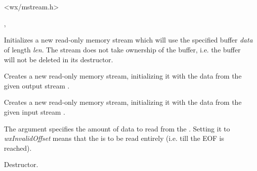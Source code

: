 \section{}\label{wxmeminputstream}




<wx/mstream.h>


, 


\label{wxmemoryinputstreamctor}


Initializes a new read-only memory stream which will use the specified buffer
{\it data} of length {\it len}. The stream does not take ownership of the 
buffer, i.e. the buffer will not be deleted in its destructor.


Creates a new read-only memory stream, initializing it with the
data from the given output stream .


Creates a new read-only memory stream, initializing it with the
data from the given input stream .

The  argument specifies the amount of data to read from
the . Setting it to {\it wxInvalidOffset} means that
the  is to be read entirely (i.e. till the EOF is reached).


\label{wxmemoryinputstreamdtor}


Destructor.

